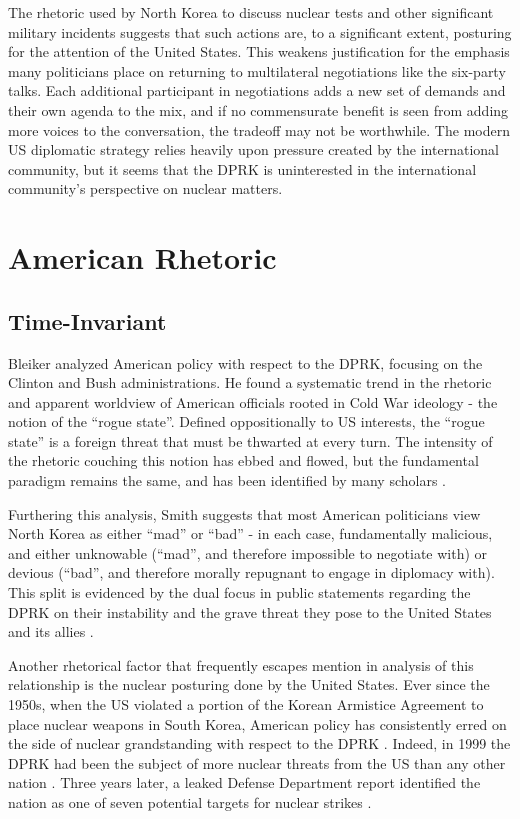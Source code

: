 The rhetoric used by North Korea to discuss nuclear tests and other significant military incidents suggests that such actions are, to a significant extent, posturing for the attention of the United States. This weakens justification for the emphasis many politicians place on returning to multilateral negotiations like the six-party talks. Each additional participant in negotiations adds a new set of demands and their own agenda to the mix, and if no commensurate benefit is seen from adding more voices to the conversation, the tradeoff may not be worthwhile. The modern US diplomatic strategy relies heavily upon pressure created by the international community, but it seems that the DPRK is uninterested in the international community's perspective on nuclear matters.


\section{American Rhetoric}
\subsection{Time-Invariant}

Bleiker \cite{bleiker} analyzed American policy with respect to the DPRK, focusing on the Clinton and Bush administrations. He found a systematic trend in the rhetoric and apparent worldview of American officials rooted in Cold War ideology - the notion of the ``rogue state''. Defined oppositionally to US interests, the ``rogue state'' is a foreign threat that must be thwarted at every turn. The intensity of the rhetoric couching this notion has ebbed and flowed, but the fundamental paradigm remains the same, and has been identified by many scholars \cite{bleiker,cumings,sigal,smith}.

Furthering this analysis, Smith suggests that most American politicians view North Korea as either ``mad'' or ``bad'' - in each case, fundamentally malicious, and either unknowable (``mad'', and therefore impossible to negotiate with) or devious (``bad'', and therefore morally repugnant to engage in diplomacy with). This split is evidenced by the dual focus in public statements regarding the DPRK on their instability and the grave threat they pose to the United States and its allies \cite{smith}. 

Another rhetorical factor that frequently escapes mention in analysis of this relationship is the nuclear posturing done by the United States. Ever since the 1950s, when the US violated a portion of the Korean Armistice Agreement to place nuclear weapons in South Korea, American policy has consistently erred on the side of nuclear grandstanding with respect to the DPRK \cite{cumings}. Indeed, in 1999 the DPRK had been the subject of more nuclear threats from the US than any other nation \cite{sigal}. Three years later, a leaked Defense Department report identified the nation as one of seven potential targets for nuclear strikes \cite{harnisch}.

